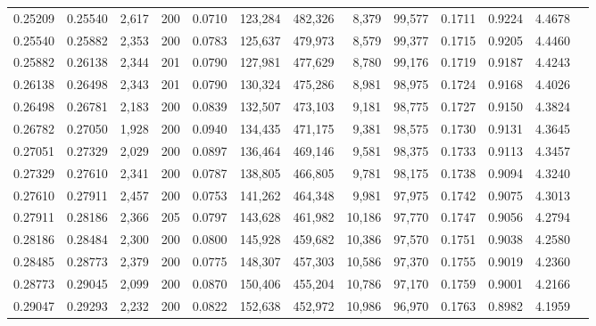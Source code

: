 \begin{tabular}{rrrrrrrrrrrrr}
0.25209 & 0.25540 & 2,617 & 200 &                                     0.0710 & 123,284 & 482,326 &   8,379 &  99,577 & 0.1711 & 0.9224 & 4.4678 \\
0.25540 & 0.25882 & 2,353 & 200 &                                     0.0783 & 125,637 & 479,973 &   8,579 &  99,377 & 0.1715 & 0.9205 & 4.4460 \\
0.25882 & 0.26138 & 2,344 & 201 &                                     0.0790 & 127,981 & 477,629 &   8,780 &  99,176 & 0.1719 & 0.9187 & 4.4243 \\
0.26138 & 0.26498 & 2,343 & 201 &                                     0.0790 & 130,324 & 475,286 &   8,981 &  98,975 & 0.1724 & 0.9168 & 4.4026 \\
0.26498 & 0.26781 & 2,183 & 200 &                                     0.0839 & 132,507 & 473,103 &   9,181 &  98,775 & 0.1727 & 0.9150 & 4.3824 \\
0.26782 & 0.27050 & 1,928 & 200 &                                     0.0940 & 134,435 & 471,175 &   9,381 &  98,575 & 0.1730 & 0.9131 & 4.3645 \\
0.27051 & 0.27329 & 2,029 & 200 &                                     0.0897 & 136,464 & 469,146 &   9,581 &  98,375 & 0.1733 & 0.9113 & 4.3457 \\
0.27329 & 0.27610 & 2,341 & 200 &                                     0.0787 & 138,805 & 466,805 &   9,781 &  98,175 & 0.1738 & 0.9094 & 4.3240 \\
0.27610 & 0.27911 & 2,457 & 200 &                                     0.0753 & 141,262 & 464,348 &   9,981 &  97,975 & 0.1742 & 0.9075 & 4.3013 \\
0.27911 & 0.28186 & 2,366 & 205 &                                     0.0797 & 143,628 & 461,982 &  10,186 &  97,770 & 0.1747 & 0.9056 & 4.2794 \\
0.28186 & 0.28484 & 2,300 & 200 &                                     0.0800 & 145,928 & 459,682 &  10,386 &  97,570 & 0.1751 & 0.9038 & 4.2580 \\
0.28485 & 0.28773 & 2,379 & 200 &                                     0.0775 & 148,307 & 457,303 &  10,586 &  97,370 & 0.1755 & 0.9019 & 4.2360 \\
0.28773 & 0.29045 & 2,099 & 200 &                                     0.0870 & 150,406 & 455,204 &  10,786 &  97,170 & 0.1759 & 0.9001 & 4.2166 \\
0.29047 & 0.29293 & 2,232 & 200 &                                     0.0822 & 152,638 & 452,972 &  10,986 &  96,970 & 0.1763 & 0.8982 & 4.1959 \\

\end{tabular}
